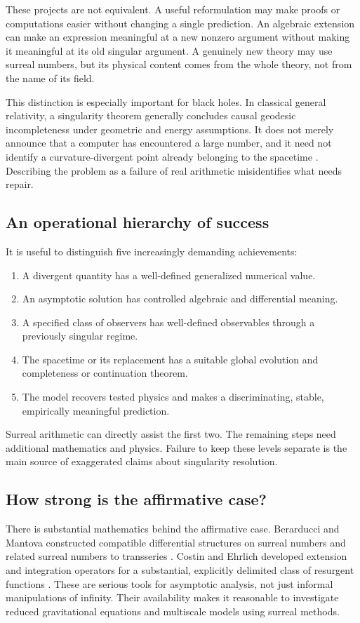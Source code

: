 \documentclass[11pt,a4paper]{article}
\numberwithin{equation}{section}
\theoremstyle{definition}
\theoremstyle{remark}
\begin{document}
These projects are not equivalent. A useful reformulation may make proofs or
computations easier without changing a single prediction. An algebraic
extension can make an expression meaningful at a new nonzero argument without
making it meaningful at its old singular argument. A genuinely new theory may
use surreal numbers, but its physical content comes from the whole theory, not
from the name of its field.

This distinction is especially important for black holes. In classical general
relativity, a singularity theorem generally concludes causal geodesic
incompleteness under geometric and energy assumptions. It does not merely
announce that a computer has encountered a large number, and it need not identify
a curvature-divergent point already belonging to the spacetime
\cite{Penrose,Witten}. Describing the problem as a failure of real arithmetic
misidentifies what needs repair.

\subsection{An operational hierarchy of success}
It is useful to distinguish five increasingly demanding achievements:
\begin{enumerate}[label=\textnormal{(\arabic*)},leftmargin=2.1em,itemsep=2pt]
\item A divergent quantity has a well-defined generalized numerical value.
\item An asymptotic solution has controlled algebraic and differential meaning.
\item A specified class of observers has well-defined observables through a
previously singular regime.
\item The spacetime or its replacement has a suitable global evolution and
completeness or continuation theorem.
\item The model recovers tested physics and makes a discriminating, stable,
empirically meaningful prediction.
\end{enumerate}
Surreal arithmetic can directly assist the first two. The remaining steps need
additional mathematics and physics. Failure to keep these levels separate is the
main source of exaggerated claims about singularity resolution.

\subsection{How strong is the affirmative case?}
There is substantial mathematics behind the affirmative case. Berarducci and
Mantova constructed compatible differential structures on surreal numbers and
related surreal numbers to transseries \cite{BM}. Costin and Ehrlich developed
extension and integration operators for a substantial, explicitly delimited
class of resurgent functions \cite{CE}. These are serious tools for asymptotic
analysis, not just informal manipulations of infinity. Their availability makes
it reasonable to investigate reduced gravitational equations and multiscale
models using surreal methods.
\end{document}

